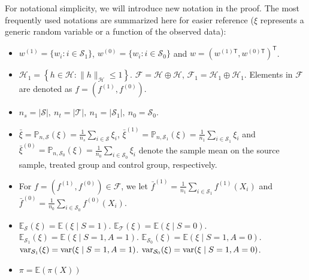 \documentclass[12pt]{article}
\newcommand{\E}{\mathbb{E}}
\newcommand{\prob}{\mathbb{P}}
\newcommand{\var}{\textnormal{var}}
\begin{document}
For notational simplicity, we will introduce new notation in the proof. The most frequently used notations are summarized here for easier reference ($\xi$ represents a generic random variable or a function of the observed data):
\begin{itemize}[itemsep=0pt]
	\item $w^{(1)} = \{w_i: i \in \mathcal{S}_1\}$, $w^{(0)} = \{w_i: i \in \mathcal{S}_0\}$ and $w = (w^{(1)\mathsf{T}}, w^{(0)\mathsf{T}})^\mathsf{T}$. 
	\item $\mathcal{H}_1 = \left\{ h\in \mathcal{H}: \| h \|_\mathcal{H} \le 1 \right\}$. $\mathcal{F} = \mathcal{H} \oplus \mathcal{H}$, $\mathcal{F}_1 = \mathcal{H}_1 \oplus \mathcal{H}_1$. 
	Elements in $\mathcal{F}$ are denoted as $f = (f^{(1)}, f^{(0)})$.
	\item $n_s = |\mathcal{S}|, ~ n_t = |\mathcal{T}|, ~ n_1 = |\mathcal{S}_1|, ~ n_0 = \mathcal{S}_0$.
	\item $\bar{\xi} = \prob_{n, \mathcal{S}}(\xi) = \frac{1}{n_s} \sum_{i \in \mathcal{S}} \xi_i$, 
	$\bar{\xi}^{(1)} = \prob_{n, \mathcal{S}_1}(\xi) = \frac{1}{n_1} \sum_{i \in \mathcal{S}_1} \xi_i$ and
	$\bar{\xi}^{(0)} = \prob_{n, \mathcal{S}_0}(\xi) = \frac{1}{n_0} \sum_{i \in \mathcal{S}_0} \xi_i$ denote the sample mean on the source sample, treated group and control group, respectively.
	\item For $f = (f^{(1)} , f^{(0)}) \in \mathcal{F}$, we let $\bar{f}^{(1)} = \frac{1}{n_1} \sum_{i \in \mathcal{S}_1} f^{(1)}(X_i)$ and $\bar{f}^{(0)} = \frac{1}{n_0} \sum_{i \in \mathcal{S}_0} f^{(0)}(X_i)$.
	\item $\E_\mathcal{S}(\xi) = \E(\xi \mid S=1)$.
	$\E_\mathcal{T}(\xi) = \E(\xi \mid S=0)$.
	$\E_{\mathcal{S}_1}(\xi) = \E(\xi \mid S=1, A=1)$.
	$\E_{\mathcal{S}_0}(\xi) = \E(\xi \mid S=1, A=0)$.
	$\var_{\mathcal{S}_1}(\xi) = \var(\xi \mid S=1, A=1)$.
	$\var_{\mathcal{S}_0}(\xi) = \var(\xi \mid S=1, A=0)$.
	\item $\pi = \E(\pi(X))$
\end{itemize}
\end{document}
